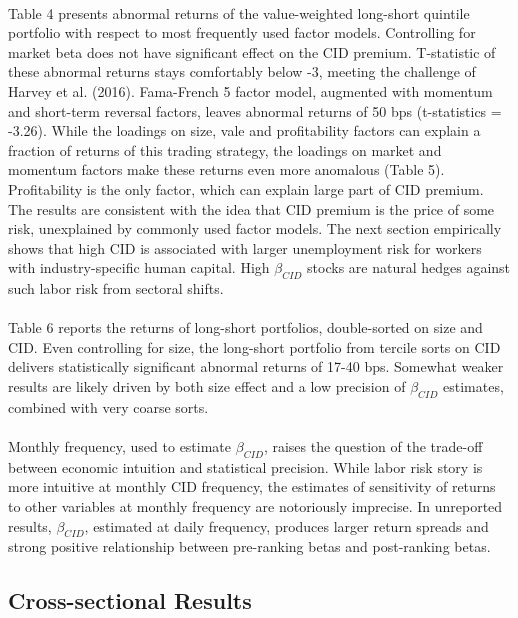 \documentclass[12pt]{article}
\begin{document}
\paragraph{}
Table 4 presents abnormal returns of the value-weighted long-short quintile portfolio with respect to most frequently used factor models. Controlling for market beta does not have significant effect on the CID premium. T-statistic of these abnormal returns stays comfortably below -3, meeting the challenge of Harvey et al. (2016). Fama-French 5 factor model, augmented with momentum and short-term reversal factors, leaves abnormal returns of 50 bps (t-statistics = -3.26). While the loadings on size, vale and profitability factors can explain a fraction of returns of this trading strategy, the loadings on market and momentum factors make these returns even more anomalous (Table 5). Profitability is the only factor, which can explain large part of CID premium. The results are consistent with the idea that CID premium is the price of some risk, unexplained by commonly used factor models. The next section empirically shows that high CID is associated with larger unemployment risk for workers with industry-specific human capital. High $\beta_{CID}$ stocks are natural hedges against such labor risk from sectoral shifts.
\paragraph{}
Table 6 reports the returns of long-short portfolios, double-sorted on size and CID. Even controlling for size, the long-short portfolio from tercile sorts on CID delivers statistically significant abnormal returns of 17-40 bps. Somewhat weaker results are likely driven by both size effect and a low precision of $\beta_{CID}$ estimates, combined with very coarse sorts.
\paragraph{}
Monthly frequency, used to estimate $\beta_{CID}$, raises the question of the trade-off between economic intuition and statistical precision. While labor risk story is more intuitive at monthly CID frequency, the estimates of sensitivity of returns to other variables at monthly frequency are notoriously imprecise. In unreported results, $\beta_{CID}$, estimated at daily frequency, produces larger return spreads and strong positive relationship between pre-ranking betas and post-ranking betas.

\subsection{Cross-sectional Results}
\end{document}
